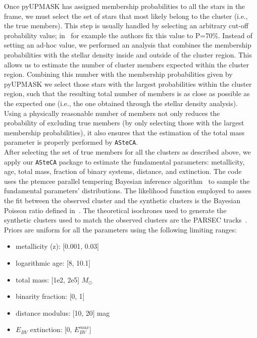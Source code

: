 \documentclass{aa}
\begin{document}
  Once pyUPMASK has assigned membership probabilities to all the stars in the
  frame, we must select the set of stars that most likely belong to the
  cluster (i.e., the true members). This step is usually handled by selecting
  an arbitrary cut-off probability value; in~\cite{Cantat_2020} for example
  the authors fix this value to P=70\%. Instead of setting an ad-hoc value, we
  performed an analysis that combines the membership probabilities with the
  stellar density inside and outside of the cluster region. This allows us to
  estimate the number of cluster members expected within the cluster region.
  Combining this number with the membership probabilities given by pyUPMASK we
  select those stars with the largest probabilities within the cluster region,
  such that the resulting total number of members is as close as possible as the
  expected one (i.e., the one obtained through the stellar density analysis).
  Using a physically reasonable number of members not only reduces the
  probability of excluding true members (by only selecting those with the
  largest membership probabilities), it also ensures that the estimation of the
  total mass parameter is properly performed by \texttt{ASteCA}.\\

  After selecting the set of true members for all the clusters as described
  above, we apply our \texttt{ASteCA} package to estimate the fundamental
  parameters: metallicity, age, total mass, fraction of binary systems,
  distance, and extinction. The code uses the ptemcee parallel tempering
  Bayesian inference algorithm~\citep{ptemcee} to sample the fundamental
  parameters' distributions. The likelihood function employed to asses the fit
  between the observed cluster and the synthetic clusters is the Bayesian
  Poisson ratio defined in~\cite{Tremmel_2013}.
  The theoretical isochrones used to generate the
  synthetic clusters used to match the observed clusters are the PARSEC
  tracks~\citep{Bressan_2012}. Priors are uniform for all the parameters using
  the following limiting ranges:

  \begin{itemize}
   \item metallicity (z): [0.001, 0.03]
   \item logarithmic age: [8, 10.1]
   \item total mass: [1e2, 2e5] $M_{\odot}$
   \item binarity fraction: [0, 1]
   \item distance modulus: [10, 20] mag
   \item $E_{BV}$ extinction: [0, $E_{BV}^{max}$]
  \end{itemize}
\end{document}
